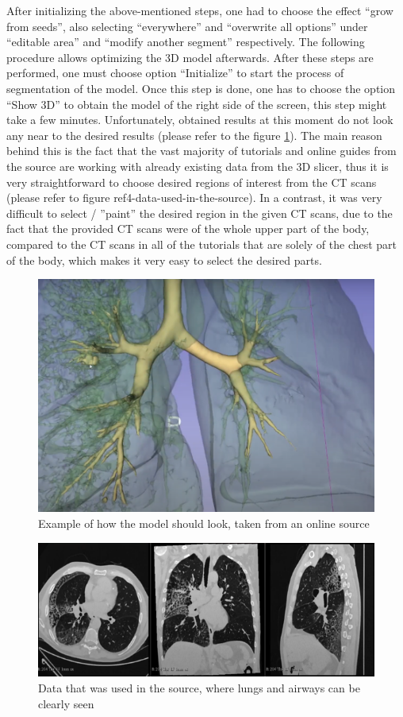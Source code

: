 \documentclass[MME,Projekt,english]{twbook}%
\begin{document}
After initializing the above-mentioned steps, one had to choose the effect “grow from seeds”, also selecting “everywhere” and “overwrite all options” under “editable area” and “modify another segment” respectively. The following procedure allows optimizing the 3D model afterwards. After these steps are performed, one must choose option “Initialize” to start the process of segmentation of the model.  Once this step is done, one has to choose the option “Show 3D” to obtain the model of the right side of the screen, this step might take a few minutes. 
Unfortunately, obtained results at this moment do not look any near to the desired results (please refer to the figure \ref{3-example-of-how-should-look}). The main reason behind this is the fact that the vast majority of tutorials and online guides from the source are working with already existing data from the 3D slicer, thus it is very straightforward to choose desired regions of interest from the CT scans (please refer to figure ref{4-data-used-in-the-source}). In a contrast, it was very difficult to select / ”paint” the desired region in the given CT scans, due to the fact that the provided CT scans were of the whole upper part of the body, compared to the CT scans in all of the tutorials that are solely of the chest part of the body, which makes it very easy to select the desired parts. 

\begin{figure}[!htbp]
	\centering
	\includegraphics[width=.4\linewidth]{images/existing-evaluation/3-example-of-how-should-look}
	\caption{Example of how the model should look, taken from an online source}\label{3-example-of-how-should-look}
\end{figure}

\begin{figure}[!htbp]
	\centering
	\includegraphics[width=.4\linewidth]{images/existing-evaluation/4-data-used-in-the-source}
	\caption{Data that was used in the source, where lungs and airways can be clearly seen}\label{4-data-used-in-the-source}
\end{figure}
\end{document}

